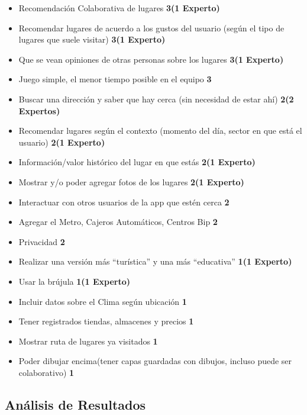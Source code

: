 \documentclass[10pt,letterpaper]{article}
\begin{document}
\begin{itemize}
\item Recomendación Colaborativa de lugares \textbf{3(1 Experto)}
\item Recomendar lugares de acuerdo a los gustos del usuario (según el tipo de lugares que suele visitar)  \textbf{3(1 Experto)}
\item Que se vean opiniones de otras personas sobre los lugares \textbf{3(1 Experto)}
\item Juego simple, el menor tiempo posible en el equipo \textbf{3}
\item Buscar una dirección y saber que hay cerca (sin necesidad de estar ahí) \textbf{2(2 Expertos)}
\item Recomendar lugares según el contexto (momento del día, sector en que está el usuario) \textbf{2(1 Experto)}
\item Información/valor histórico del lugar en que estás \textbf{2(1 Experto)}
\item Mostrar y/o poder agregar fotos de los lugares \textbf{2(1 Experto)}
\item Interactuar con otros usuarios de la app que estén cerca \textbf{2}
\item Agregar el Metro, Cajeros Automáticos, Centros Bip \textbf{2}
\item Privacidad \textbf{2}
\item Realizar una versión más “turística” y una más “educativa” \textbf{1(1 Experto)}
\item Usar la brújula \textbf{1(1 Experto)}
\item Incluir datos sobre el Clima según ubicación \textbf{1}
\item Tener registrados tiendas, almacenes y precios \textbf{1}
\item Mostrar ruta de lugares ya visitados \textbf{1} 
\item Poder dibujar encima(tener capas guardadas con dibujos, incluso puede ser colaborativo) \textbf{1}
\end{itemize}


\subsection{Análisis de Resultados}
\end{document}
